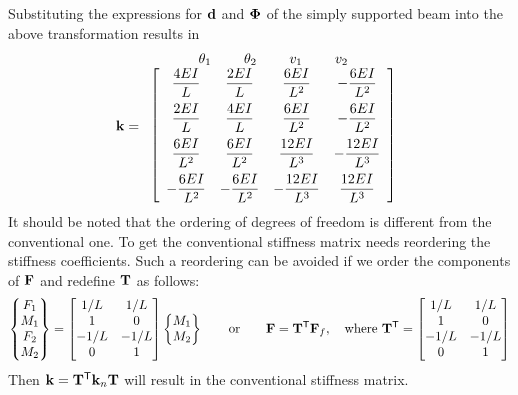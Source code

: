 Substituting the expressions for $\mathbf{d}$ and $\bm{\Phi}$ of the simply supported beam into the above transformation results in
\begin{equation*}
  \kmat = \begin{array}{c}
    \begin{array}{cccc}\ \ \theta_1\ \ & \ \ \theta_2\ \ & \ \ v_1\ \ & \ \ v_2\ \ \end{array}\\
    \left[\begin{array}{cccc}
      \dfrac{4EI}{L} & \dfrac{2EI}{L} & \dfrac{6EI}{L^2} & -\dfrac{6EI}{L^2}\\[8pt]
      \dfrac{2EI}{L} & \dfrac{4EI}{L} & \dfrac{6EI}{L^2} & -\dfrac{6EI}{L^2}\\[8pt]
      \dfrac{6EI}{L^2} & \dfrac{6EI}{L^2} & \dfrac{12EI}{L^3} & -\dfrac{12EI}{L^3}\\[8pt]
      -\dfrac{6EI}{L^2} & -\dfrac{6EI}{L^2} & -\dfrac{12EI}{L^3} & \dfrac{12EI}{L^3}
    \end{array}\right]
  \end{array}
\end{equation*}
It should be noted that the ordering of degrees of freedom is different from the conventional one. To get the conventional stiffness matrix needs reordering the stiffness coefficients. Such a reordering can be avoided if we order the components of $\mathbf{F}$ and redefine $\mathbf{T}$ as follows:
\begin{equation*}
  \begin{Bmatrix}F_1\\ M_1\\ F_2\\ M_2\end{Bmatrix} = \begin{bmatrix}1/L & 1/L\\ 1 & 0\\ -1/L & -1/L\\ 0 & 1\end{bmatrix}\begin{Bmatrix}M_1\\ M_2\end{Bmatrix}\qquad\text{or}\qquad \mathbf{F} = \mathbf{T}^{\mathsf{T}}\mathbf{F}_f,\quad\text{where } \mathbf{T}^{\mathsf{T}} = \begin{bmatrix}1/L & 1/L\\ 1 & 0\\ -1/L & -1/L\\ 0 & 1\end{bmatrix}
\end{equation*}
Then $\mathbf{k} = \mathbf{T}^{\mathsf{T}}\mathbf{k}_n\mathbf{T}$ will result in the conventional stiffness matrix.

